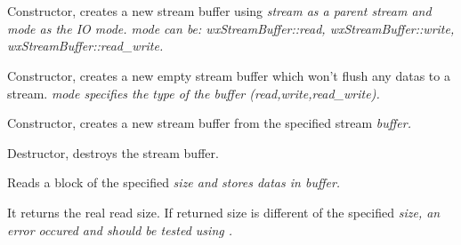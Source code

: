 \section{}\label{wxstreambuf}






Constructor, creates a new stream buffer using \it{stream} as a parent stream
and \it{mode} as the IO mode. \it{mode} can be: wxStreamBuffer::read,
wxStreamBuffer::write, wxStreamBuffer::read_write.


Constructor, creates a new empty stream buffer which won't flush any datas
to a stream. \it{mode} specifies the type of the buffer (read,write,read_write).


Constructor, creates a new stream buffer from the specified stream \it{buffer}.


Destructor, destroys the stream buffer.


\label{wxstreambufread}

Reads a block of the specified \it{size} and stores datas in \it{buffer}.


It returns the real read size. If returned size is different of the specified
\it{size}, an error occured and should be tested using
.

\label{wxstreambufreadbuf}


